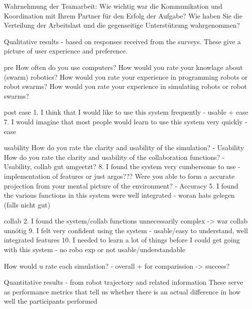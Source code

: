 \documentclass[german,version-2020-11]{uzl-thesis}
\begin{document}
        Wahrnehmung der Teamarbeit:
        Wie wichtig war die Kommunikation und Koordination mit Ihrem Partner für den Erfolg der Aufgabe?
        Wie haben Sie die Verteilung der Arbeitslast und die gegenseitige Unterstützung wahrgenommen?

        Qualitative results - based on responses received from the surveys. 
          These give a picture of user experience and preference. 
            
            pre
              How often do you use computers? 
              How would you rate your knowlage about (swarm) robotics?
              How would you rate your experience in programming robots or robot swarms?
              How would you rate your experience in simulating robots or robot swarms?
          
          
            post
              ease
              1. I think that I would like to use this system frequently - usable + ease
              7. I would imagine that most people would learn to use this system very quickly -ease
      
              usability
              How do you rate the clarity and usability of the simulation? - Usability
              How do you rate the clarity and usability of the collaboration functions? - Usability, collab gut umgeetzt?
              8. I found the system very cumbersome to use - implementation of features or just argos???
              Were you able to form a accurate projection from your mental picture of the environment? - Accuracy
              5. I found the various functions in this system were well integrated - woran hats gelegen (falls nicht gut)
              
              collab
              2. I found the system/collab functions unnecessarily complex -> war collab unnötig
              9. I felt very confident using the system - usable/easy to understand, well integrated features
              10. I needed to learn a lot of things before I could get going with this system - no robo exp or not usable/understandable
            
              
              How would u rate each simulation? - overall + for comparission -> success?
        


        Quantitative results - from robot trajectory and related information 
          These serve as performance metrics that tell us whether there is an actual difference in how well 
          the participants performed
\end{document}
